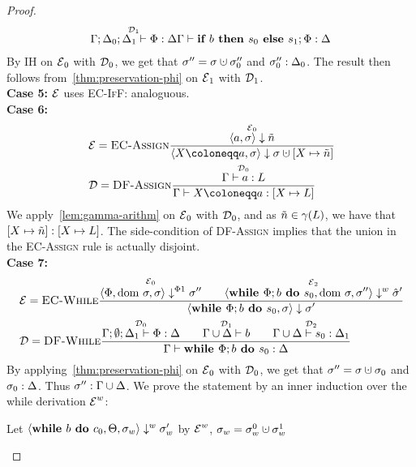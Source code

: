 \begin{proof}
\begin{align*}
{        \overset{\operatorname{\mathcal{D}}_1}{\Gamma;\Delta_0;\Delta_1 \vdash {\Phi}: \Delta}}
        {\Gamma \vdash {\textbf{if }{b} \textbf{ then }{s_0}\textbf{ else }{s_1};{\Phi}}: \Delta}
    \end{align*}
    By IH on $\operatorname{\mathcal{E}}_0$ with $\operatorname{\mathcal{D}}_0$, we get that $\store'' = \store \dunion \store''_0$ and 
    ${\sigma''_0}:{\Delta_0}$.
    The result then follows from~\autoref{thm:preservation-phi} on $\operatorname{\mathcal{E}}_1$ with $\operatorname{\mathcal{D}}_1$.\\
    \textbf{Case 5:}
    $\operatorname{\mathcal{E}}$ uses \textsc{EC-IfF}: analoguous.\\
    \textbf{Case 6:}
    \begin{align*}
        &\E = \bsrule{EC-Assign}{\overset{\E_0}{\bigstep{a}{\store}{\flaggedn{}}}}
        {\bigstep{\defaultstore}{\store}{\storeassign{\store}{X \mapsto \flaggedn{}}}}\\
        &\D = \trule{DF-Assign}{\overset{\D_0}{\typestep{\Gamma}{a}{L}}}
        {\typestep{\Gamma}{\defaultstore}{[X \mapsto L]}}
    \end{align*}
    We apply~\autoref{lem:gamma-arithm} on $\operatorname{\mathcal{E}}_0$ with $\operatorname{\mathcal{D}}_0$,
    and as $\flaggedn{} \in \gamma(L)$, we have that $\matches{[X \mapsto \flaggedn{}]}{[X \mapsto L]}$.
    The side-condition of \textsc{DF-Assign} implies that the union in the \textsc{EC-Assign}
    rule is actually disjoint.
    \\
    \textbf{Case 7:}\\
    \begin{align*}
        &\operatorname{\mathcal{E}} = \textsc{EC-While}\frac{\displaystyle \overset{\operatorname{\mathcal{E}}_0}{\langle \Phi, \text{dom }{\sigma}, \sigma \rangle \downarrow^{\Phi1} \sigma''}\qquad
        \overset{\operatorname{\mathcal{E}}_2}{\langle \textbf{while }\Phi;{b} \textbf{ do } {s_0}, \text{dom }{\sigma}, \sigma'' \rangle \downarrow^w \hat{\sigma}'}}{\displaystyle \langle \textbf{while }\Phi;{b} \textbf{ do } {s_0}, \sigma \rangle \downarrow \sigma'}\\
        &\operatorname{\mathcal{D}} = \textsc{DF-While}\frac{\displaystyle \overset{\operatorname{\mathcal{D}}_0}{\Gamma;\emptyset;\Delta_1 \vdash {\Phi}: \Delta}\qquad
        \overset{\operatorname{\mathcal{D}}_1}{\Gamma \cup \Delta \vdash {b}}\qquad
        \overset{\operatorname{\mathcal{D}}_2}{\Gamma \cup \Delta \vdash {s_0}: \Delta_1}}{\displaystyle \Gamma \vdash {\textbf{while }\Phi;{b} \textbf{ do } {s_0}}: \Delta}
    \end{align*}
    By applying~\autoref{thm:preservation-phi} on $\operatorname{\mathcal{E}}_0$ with $\operatorname{\mathcal{D}}_0$, we get that
    $\store'' = \store \dunion \store_0$ and ${\sigma_0}:{\Delta}$.
    Thus ${\sigma''}:{\Gamma \cup \Delta}$.
    We prove the statement by an inner induction over the while derivation $\operatorname{\mathcal{E}}^w$:
    \begin{claim}
        Let $\langle \textbf{while }{b} \textbf{ do } {c_0}, \Theta, \sigma_w \rangle \downarrow^w \sigma_w'$ by $\operatorname{\mathcal{E}}^w$,
         $\store_w = \store_w^0 \dunion \store_w^1$

\end{claim}
\end{proof}
